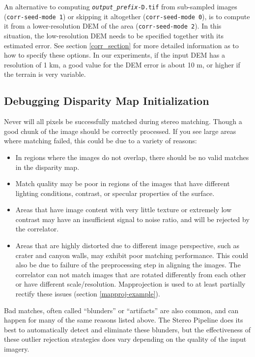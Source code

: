 An alternative to computing \texttt{\textit{output\_prefix}-D.tif}
from sub-sampled images (\texttt{corr-seed-mode 1}) or skipping it
altogether (\texttt{corr-seed-mode 0}), is to compute it from a
lower-resolution DEM of the area (\texttt{corr-seed-mode 2}). In this
situation, the low-resolution DEM needs to be specified together with its estimated
error. See section \ref{corr_section} for more detailed information as
to how to specify these options. In our experiments, if the input DEM
has a resolution of 1 km, a good value for the DEM error is about 10 m,
or higher if the terrain is very variable.

\subsection{Debugging Disparity Map Initialization}

Never will all pixels be successfully matched during stereo
matching. Though a good chunk of the image should be correctly
processed. If you see large areas where matching failed, this could be
due to a variety of reasons:

\begin{itemize}
\item In regions where the images do not overlap, there should be no
  valid matches in the disparity map.
\item Match quality may be poor in regions of the images that have
  different lighting conditions, contrast, or specular properties of
  the surface.
\item Areas that have image content with very little texture or
  extremely low contrast may have an insufficient signal to noise
  ratio, and will be rejected by the correlator.
\item Areas that are highly distorted due to different image
  perspective, such as crater and canyon walls, may exhibit poor
  matching performance. This could also be due to failure of the
  preprocessing step in aligning the images. The correlator can not
  match images that are rotated differently from each other or have
  different scale/resolution. Mapprojection is used to at least
  partially rectify these issues (section \ref{mapproj-example}).
\end{itemize}

Bad matches, often called ``blunders'' or ``artifacts'' are also
common, and can happen for many of the same reasons listed above.  The
Stereo Pipeline does its best to automatically detect and eliminate
these blunders, but the effectiveness of these outlier rejection
strategies does vary depending on the quality of the input imagery.


